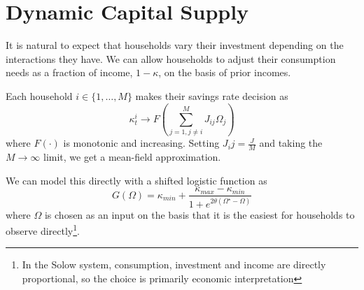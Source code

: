 \documentclass[11pt]{article}
\begin{document}
\section{Dynamic Capital Supply}
It is natural to expect that households vary their investment depending on the interactions they have. We can allow households to adjust their consumption needs as a fraction of income, $1-\kappa$, on the basis of prior incomes.

Each household $i\in\{1,\dots,M\}$ makes their savings rate decision as
\begin{equation}
\kappa_t^{i} \rightarrow F\left(\sum^M_{j=1,j\neq i}J_{ij}\Omega_j\right)
\end{equation}
where $F(\cdot)$ is monotonic and increasing. Setting $J_ij=\frac{J}{M}$ and taking the $M\rightarrow\infty$ limit, we get a mean-field approximation. 

We can model this directly with a shifted logistic function as 
\begin{equation}
G(\Omega) = \kappa_{min} + \frac{\kappa_{max}-\kappa_{min}}{1 + e^{2\theta(\Omega^{\star}-\Omega)}}
\end{equation}
where $\Omega$ is chosen as an input on the basis that it is the easiest for households to observe directly\footnote{In the Solow system, consumption, investment and income are directly proportional, so the choice is primarily economic interpretation}. 
\end{document}
